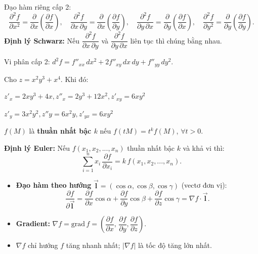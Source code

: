 \documentclass[12pt,a4paper]{article}
\begin{document}
\begin{dinhnghia}[title={Đạo hàm và vi phân cấp cao}]
  Đạo hàm riêng cấp 2:
  \[
    \dfrac{\partial^2 f}{\partial x^2} = \dfrac{\partial}{\partial x}\!\left(\dfrac{\partial f}{\partial x}\right),\quad
    \dfrac{\partial^2 f}{\partial x\,\partial y} = \dfrac{\partial}{\partial x}\!\left(\dfrac{\partial f}{\partial y}\right),\quad
    \dfrac{\partial^2 f}{\partial y\,\partial x} = \dfrac{\partial}{\partial y}\!\left(\dfrac{\partial f}{\partial x}\right),\quad
    \dfrac{\partial^2 f}{\partial y^2} = \dfrac{\partial}{\partial y}\!\left(\dfrac{\partial f}{\partial y}\right).
  \]
  \textbf{Định lý Schwarz:} Nếu $\dfrac{\partial^2 f}{\partial x\,\partial y}$ và $\dfrac{\partial^2 f}{\partial y\,\partial x}$ liên tục thì chúng bằng nhau.

  Vi phân cấp 2: $d^2 f = f''_{xx}\,dx^2 + 2f''_{xy}\,dx\,dy + f''_{yy}\,dy^2$.
\end{dinhnghia}

\begin{vidu}
    Cho $z = x^2 y^3 + x^4$. Khi đó:
    
    $z'_x = 2xy^3 + 4x, z''_x = 2y^3 + 12x^2, z'_{xy} = 6xy^2$

    $z'_y = 3x^2y^2, z''y = 6x^2y, z'_{yx} = 6xy^2$
\end{vidu}

\begin{dinhnghia}[title={Hàm số thuần nhất}]
  $f(M)$ là \textbf{thuần nhất bậc $k$} nếu $f(tM) = t^k f(M)$, $\forall t > 0$.

  \textbf{Định lý Euler:} Nếu $f(x_1,x_2,...,x_n)$ thuần nhất bậc $k$ và khả vi thì:
  \[
    \displaystyle \sum _{i=1}^n x_i\,\dfrac{\partial f}{\partial x_i} = k\,f(x_1,x_2,...,x_n).
  \]
\end{dinhnghia}

\begin{dinhnghia}[title={Đạo hàm theo hướng và gradient}]
  \begin{itemize}
    \item \textbf{Đạo hàm theo hướng} $\vec{\mathbf{l}} = (\cos\alpha, \cos\beta, \cos\gamma)$ (vectơ đơn vị):
      \[
        \dfrac{\partial f}{\partial \vec{\mathbf{l}}} = \dfrac{\partial f}{\partial x}\cos\alpha + \dfrac{\partial f}{\partial y}\cos\beta + \dfrac{\partial f}{\partial z}\cos\gamma = \nabla f \cdot \vec{\mathbf{l}}.
      \]
    \item \textbf{Gradient:} $\nabla f = \text{grad}\,f = \left(\dfrac{\partial f}{\partial x},\, \dfrac{\partial f}{\partial y}, \dfrac{\partial f}{\partial z}\right)$.
    \item $\nabla f$ chỉ hướng $f$ tăng nhanh nhất; $|\nabla f|$ là tốc độ tăng lớn nhất.
  \end{itemize}
\end{dinhnghia}
\end{document}
